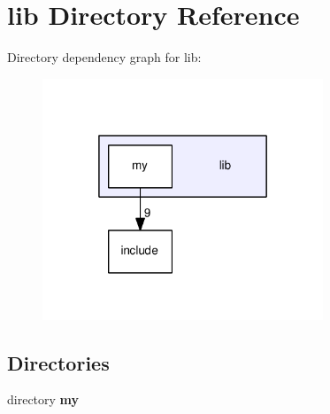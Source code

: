 \section{lib Directory Reference}
\label{dir_97aefd0d527b934f1d99a682da8fe6a9}
Directory dependency graph for lib\-:\nopagebreak
\begin{figure}[H]
\begin{center}
\leavevmode
\includegraphics[width=238pt]{dir_97aefd0d527b934f1d99a682da8fe6a9_dep}
\end{center}
\end{figure}
\subsection*{Directories}
\begin{DoxyCompactItemize}
\item 
directory {\bf my}
\end{DoxyCompactItemize}
